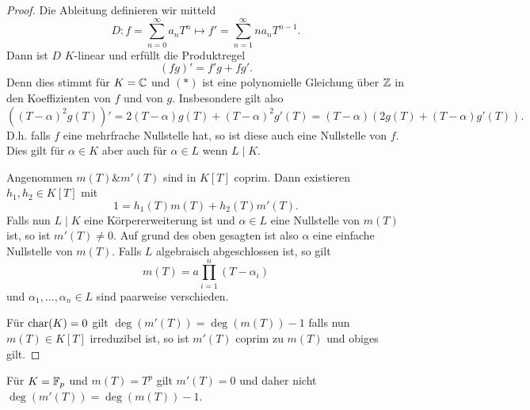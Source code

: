 \begin{proof}
	Die Ableitung definieren wir mitteld
	\[
	D: f = \sum_{n=0}^{\infty} a_{n} T^{n} \mapsto f' = \sum_{n=1}^{\infty} n a_{n} T^{n-1}
	.\] 
	Dann ist $D$ $K$-linear und erfüllt die Produktregel
	\[
		(f g)' = f' g + f g' \tag{$*$}
	.\] 
	Denn dies stimmt für $K = \mathbb{C}$ und $(*)$ ist eine polynomielle Gleichung über $\mathbb{Z}$ in den Koeffizienten von $f$ und von $g$.
	Insbesondere gilt also
	\[
		((T-\alpha)^2 g(T))' = 2 (T-\alpha) g(T) + (T-\alpha)^2 g'(T) = (T-\alpha) (2 g(T) + (T-\alpha) g'(T))
	.\] 
	D.h. falls $f$ eine mehrfrache Nullstelle hat, so ist diese auch eine Nullstelle von $f$.
	Dies gilt für $\alpha \in K$ aber auch für $\alpha \in L$ wenn $L \mid K$.

	Angenommen $m(T) \& m'(T)$ sind in $K[T]$ coprim. Dann existieren $h_1,h_2 \in K[T]$ mit
	\[
		1 = h_1(T) m(T) + h_2(T) m'(T)
	.\] 
	Falls nun $L \mid K$ eine Körpererweiterung ist und $\alpha \in L$ eine Nullstelle von $m(T)$ ist,
	so ist $m'(T) \neq 0$. Auf grund des oben gesagten ist also $\alpha$ eine einfache Nullstelle von $m(T)$.
	Falls $L$ algebraisch abgeschlossen ist, so gilt
	\[
		m(T) = a \prod_{i=1}^{n} (T-\alpha_{i})
	\] 
	und $\alpha_{1},\ldots, \alpha_{n} \in L$ sind paarweise verschieden.

	Für $\operatorname{char}(K) = 0$ gilt $\deg(m'(T)) = \deg(m(T)) - 1$ falls nun $m(T) \in K[T]$ irreduzibel ist, so ist $m'(T)$ coprim zu $m(T)$ und obiges gilt.
\end{proof}

\begin{remark}
	 Für $K = \mathbb{F}_{p}$ und $m(T) = T^{p}$ gilt $m'(T) = 0$ und daher nicht $\deg(m'(T)) = \deg(m(T)) -1$.
\end{remark}


